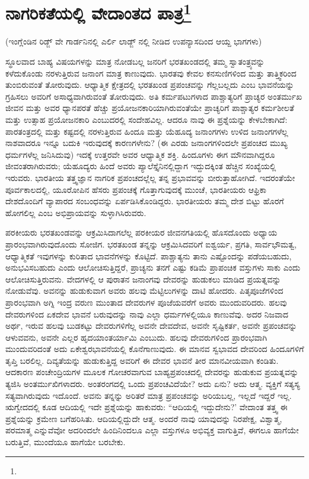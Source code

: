
\chapter{ನಾಗರಿಕತೆಯಲ್ಲಿ ವೇದಾಂತದ ಪಾತ್ರ\protect\footnote{}}

\begin{center}
(ಇಂಗ್ಲೆಂಡಿನ ರಿಡ್ಜ್ ವೇ ಗಾರ್ಡನಿನಲ್ಲಿ ಎರ್ಲಿ ಲಾಡ್ಜ್ ನಲ್ಲಿ ನೀಡಿದ ಉಪನ್ಯಾಸದಿಂದ ಆಯ್ದ ಭಾಗಗಳು)
\end{center}

ಸ್ಥೂಲವಾದ ಬಾಹ್ಯ ವಿಷಯಗಳನ್ನು ಮಾತ್ರ ನೋಡಬಲ್ಲ ಜನರಿಗೆ ಭರತಖಂಡದಲ್ಲಿ ತಮ್ಮ ಸ್ವಾತಂತ್ರ್ಯವನ್ನು ಕಳೆದುಕೊಂಡು ನರಳುತ್ತಿರುವ ಜನಾಂಗ ಮಾತ್ರ ಕಾಣುವುದು. ಭಾರತವು ಕೇವಲ ಕನಸುಣಿಗಳಿಂದ ಮತ್ತು ತಾತ್ತ್ವಿಕರಿಂದ ತುಂಬಿರುವಂತೆ ತೋರುವುದು. ಆಧ್ಯಾತ್ಮಿಕ ಕ್ಷೇತ್ರದಲ್ಲಿ ಭರತಖಂಡ ಪ್ರಪಂಚವನ್ನು ಗೆಲ್ಲಬಲ್ಲದು ಎಂಬ ಭಾವನೆಯನ್ನು ಗ್ರಹಿಸಲು ಅವರಿಗೆ ಅಸಾಧ್ಯವಾಗಿರುವಂತೆ ತೋರುವುದು. ಅತಿ ಕರ್ಮಪಟುಗಳಾದ ಪಾಶ್ಚಾತ್ಯರಿಗೆ ಪ್ರಾಚ್ಯರ ಅಂತರ್ಮುಖ ಜೀವನ ಮತ್ತು ಅವರ ಧ್ಯಾನಪರತೆ ಹೆಚ್ಚು ಪ್ರಯೋಜನಕಾರಿಯಾಗಿರುವಂತೆಯೇ ಪ್ರಾಚ್ಯರಿಗೆ ಪಾಶ್ಚಾತ್ಯರ ಕರ್ಮಶೀಲತೆ ಮತ್ತು ಉತ್ಸಾಹ ಪ್ರಯೋಜನಕಾರಿ ಎಂಬುದರಲ್ಲಿ ಸಂದೇಹವಿಲ್ಲ. ಆದರೂ ನಾವು ಈ ಪ್ರಶ್ನೆಯನ್ನು ಕೇಳಬೇಕಾಗಿದೆ: ಪಾರತಂತ್ರದಲ್ಲಿ ಮತ್ತು ಕಷ್ಟದಲ್ಲಿ ನರಳುತ್ತಿರುವ ಹಿಂದೂ ಮತ್ತು ಯೆಹೂದ್ಯ ಜನಾಂಗಗಳು ಉಳಿದ ಜನಾಂಗಗಳೆಲ್ಲ ನಾಶವಾದರೂ ಇನ್ನೂ ಬದುಕಿ ಇರುವುದಕ್ಕೆ ಕಾರಣಗಳೇನು? (ಈ ಎರಡು ಜನಾಂಗಗಳಿಂದಲೇ ಪ್ರಪಂಚದ ಮುಖ್ಯ ಧರ್ಮಗಳೆಲ್ಲ ಜನಿಸಿದುವು) ಇದಕ್ಕೆ ಉತ್ತರವೇ ಅವರ ಆಧ್ಯಾತ್ಮಿಕ ಶಕ್ತಿ. ಹಿಂದೂಗಳು ಈಗ ಮೌನವಾಗಿದ್ದರೂ ಜೀವಂತರಾಗಿರುವರು; ಯೆಹೂದ್ಯರು ಹಿಂದೆ ಅವರು ಪ್ಯಾಲೆಸ್ತೈನಿನಲ್ಲಿದ್ದಾಗ ಇದ್ದುದಕ್ಕಿಂತ ಹೆಚ್ಚಿನ ಸಂಖ್ಯೆಯಲ್ಲಿ ಇರುವರು. ಭಾರತೀಯ ತತ್ತ್ವಜ್ಞಾನ ನಾಗರಿಕ ಪ್ರಪಂಚದಲ್ಲೆಲ್ಲ ತನ್ನ ಪ್ರಭಾವವನ್ನು ಬೀರುತ್ತಾಹೋಗಿದೆ. ಇದರಂತೆಯೇ ಪೂರ್ವಕಾಲದಲ್ಲಿ, ಯೂರೋಪಿನ ಹೆಸರು ಪ್ರಪಂಚಕ್ಕೆ ಗೊತ್ತಾಗುವುದಕ್ಕೆ ಮುಂಚೆ, ಭಾರತೀಯರು ಆಫ್ರಿಕಾ ದೇಶದೊಂದಿಗೆ ವ್ಯಾಪಾರದ ಸಂಬಂಧವನ್ನು ಏರ್ಪಡಿಸಿಕೊಂಡಿದ್ದರು. ಭಾರತೀಯರು ತಮ್ಮ ದೇಶ ಬಿಟ್ಟು ಹೊರಗೆ ಹೋಗಲಿಲ್ಲ ಎಂಬ ಅಭಿಪ್ರಾಯವನ್ನು ಸುಳ್ಳಾಗಿಸಿರುವರು.

ಪರಕೀಯರು ಭರತಖಂಡವನ್ನು ಆಕ್ರಮಿಸಿದಾಗಲೆಲ್ಲ ಪರಕೀಯರ ಜೀವನಗತಿಯಲ್ಲಿ ಹೊಸದೊಂದು ಅಧ್ಯಾಯ ಪ್ರಾರಂಭವಾಗಿರುವುದೊಂದು ಸೋಜಿಗ. ಭರತಖಂಡ ತನ್ನನ್ನು ಆಕ್ರಮಿಸಿದವರಿಗೆ ಐಶ್ವರ್ಯ, ಪ್ರಗತಿ, ಸಾರ್ವಭೌಮತ್ವ, ಆಧ್ಯಾತ್ಮಿಕತೆ ಇವುಗಳನ್ನು ಕುರಿತಾದ ಭಾವನೆಗಳನ್ನು ಕೊಟ್ಟಿದೆ. ಪಾಶ್ಚಾತ್ಯನು ತಾನು ಎಷ್ಟೊಂದನ್ನು ಪಡೆಯಬಹುದು, ಅನುಭವಿಸಬಹುದು ಎಂದು ಆಲೋಚಿಸುತ್ತಿದ್ದರೆ, ಪ್ರಾಚ್ಯನು ತನಗೆ ಎಷ್ಟು ಕಡಿಮೆ ಪ್ರಾಪಂಚಿಕ ವಸ್ತುಗಳು ಸಾಕು ಎಂದು ಆಲೋಚಿಸುತ್ತಿರುವನು. ವೇದಗಳಲ್ಲಿ ಆ ಪುರಾತನ ಜನಾಂಗವು ದೇವರನ್ನು ಹುಡುಕಲು ಮಾಡಿದ ಪ್ರಯತ್ನವನ್ನು ನೋಡುವೆವು. ಅವನನ್ನು ಹುಡುಕುವಾಗ ಅವರು ಹಲವು ಮೆಟ್ಟಿಲುಗಳನ್ನು ದಾಟಿ ಹೋದರು. ಪಿತೃಪೂಜೆಗಳಿಂದ ಪ್ರಾರಂಭವಾಗಿ ಅಗ್ನಿ ಇಂದ್ರ ವರುಣ ಮುಂತಾದ ದೇವರುಗಳ ಪೂಜೆಯವರೆಗೆ ಅವರು ಮುಂದುವರಿದರು. ಹಲವು ದೇವರುಗಳಿಂದ ಏಕದೇವ ಭಾವನೆ ಬರುವುದನ್ನು ನಾವು ಎಲ್ಲಾ ಧರ್ಮಗಳಲ್ಲಿಯೂ ಕಾಣುವೆವು. ಅದರ ನಿಜವಾದ ಅರ್ಥ, ಇರುವ ಹಲವು ಬುಡಕಟ್ಟು ದೇವರುಗಳಿಗೆಲ್ಲ ಅವನೇ ದೇವದೇವ, ಅವನೇ ಸೃಷ್ಟಿಕರ್ತ, ಅವನೇ ಪ್ರಪಂಚವನ್ನು ಆಳುವವನು, ಅವನೇ ಎಲ್ಲರ ಹೃದಯಾಂತರ್ಯಾಮಿ ಎಂಬುದು. ಹಲವು ದೇವರುಗಳಿಂದ ಪ್ರಾರಂಭವಾಗಿ ಮುಂದುವರಿದಂತೆ ಅದು ಏಕೇಶ್ವರಭಾವನೆಯಲ್ಲಿ ಕೊನೆಗಾಣುವುದು. ಈ ಮಾನವ ಸ್ವಭಾವದ ದೇವರಿಂದ ಹಿಂದೂಗಳಿಗೆ ತೃಪ್ತಿ ಬರಲಿಲ್ಲ. ದಿವ್ಯತೆಯನ್ನು ಹುಡುಕುತ್ತಿದ್ದ ಅವರಿಗೆ ಈ ದೇವರ ಭಾವನೆ ತೀರ ಮಾನವೀಯವಾಗಿ ಕಂಡಿತು. ಆದಕಾರಣ ಪಂಚೇಂದ್ರಿಯಗಳ ಮೂಲಕ ಗೋಚರವಾಗುವ ಬಾಹ್ಯಪ್ರಪಂಚದಲ್ಲಿ ದೇವರನ್ನು ಹುಡುಕುವ ಪ್ರಯತ್ನವನ್ನು ತ್ಯಜಿಸಿ ಅಂತರ್ಮುಖಿಗಳಾದರು. ಅಂತರಂಗದಲ್ಲಿ ಒಂದು ಪ್ರಪಂಚವಿದೆಯೇ? ಅದು ಏನು? ಅದು ಆತ್ಮ. ವ್ಯಕ್ತಿಗೆ ಸತ್ಯಸ್ಯ ಸತ್ಯವಾಗಿರುವುದು ಇದೊಂದೆ. ಅವನು ತನ್ನನ್ನು ಅರಿತರೆ ಮಾತ್ರ ಪ್ರಪಂಚವನ್ನು ಅರಿಯಬಲ್ಲ, ಇಲ್ಲದೆ ಇದ್ದರೆ ಇಲ್ಲ. ಋಗ್ವೇದದಲ್ಲಿ ಕೂಡ ಆದಿಯಲ್ಲಿ ಇದೇ ಪ್ರಶ್ನೆಯನ್ನು ಹಾಕುವರು: “ಆದಿಯಲ್ಲಿ ಇದ್ದುದೇನು?' ವೇದಾಂತ ತತ್ತ್ವ ಈ ಪ್ರಶ್ನೆಯನ್ನು ಕ್ರಮೇಣ ಬಗೆಹರಿಸಿತು. ಆದಿಯಲ್ಲಿದ್ದುದೇ ಆತ್ಮ. ಅಂದರೆ ನಾವು ಯಾವುದನ್ನು ನಿರಪೇಕ್ಷ, ವಿಶ್ವಾತ್ಮ, ಪರಮಾತ್ಮ ಎನ್ನುವೆವೋ ಅದರಿಂದಲೇ ಹಿಂದಿನಿಂದಲೂ ಎಲ್ಲಾ ವಸ್ತುಗಳೂ ಅಭಿವ್ಯಕ್ತ ವಾಗುತ್ತಿವೆ, ಈಗಲೂ ಹಾಗೆಯೇ ಬರುತ್ತಿವೆ, ಮುಂದೆಯೂ ಹಾಗೆಯೇ ಬರಬೇಕು.

